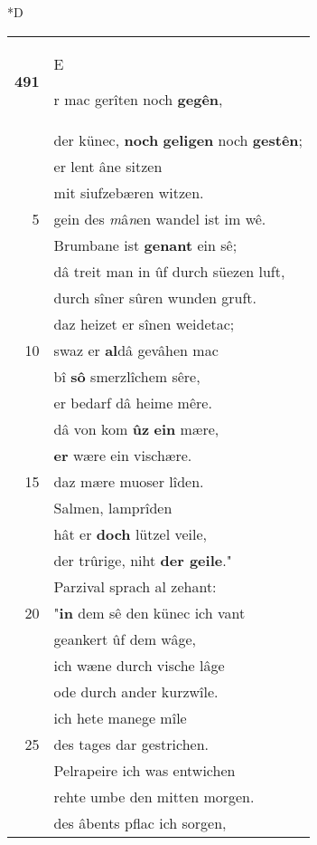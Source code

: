 \documentclass[8pt,a4paper,notitlepage]{article}
\begin{document}
\begin{table}[ht]
\begin{minipage}[t]{0.5\linewidth}
\small
\begin{center}*D
\end{center}
\begin{tabular}{rl}
\textbf{491} & \begin{large}E\end{large}r mac gerîten noch \textbf{gegên},\\ 
 & der künec, \textbf{noch} \textbf{geligen} noch \textbf{gestên};\\ 
 & er lent âne sitzen\\ 
 & mit siufzebæren witzen.\\ 
5 & gein des \textit{m}â\textit{n}en wandel ist im wê.\\ 
 & Brumbane ist \textbf{genant} ein sê;\\ 
 & dâ treit man in ûf durch süezen luft,\\ 
 & durch sîner sûren wunden gruft.\\ 
 & daz heizet er sînen weidetac;\\ 
10 & swaz er \textbf{al}dâ gevâhen mac\\ 
 & bî \textbf{sô} smerzlîchem sêre,\\ 
 & er bedarf dâ heime mêre.\\ 
 & dâ von kom \textbf{ûz} \textbf{ein} mære,\\ 
 & \textbf{er} wære ein vischære.\\ 
15 & daz mære muoser lîden.\\ 
 & Salmen, lamprîden\\ 
 & hât er \textbf{doch} lützel veile,\\ 
 & der trûrige, niht \textbf{der geile}."\\ 
 & Parzival sprach al zehant:\\ 
20 & "\textbf{in} dem sê den künec ich vant\\ 
 & geankert ûf dem wâge,\\ 
 & ich wæne durch vische lâge\\ 
 & ode durch ander kurzwîle.\\ 
 & ich hete manege mîle\\ 
25 & des tages dar gestrichen.\\ 
 & Pelrapeire ich was entwichen\\ 
 & rehte umbe den mitten morgen.\\ 
 & des âbents pflac ich sorgen,\\ 

\end{tabular}
\end{minipage}
\end{table}
\end{document}
